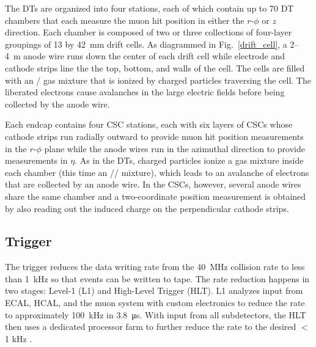 

The DTs are organized into four stations, each of which contain up to 70 DT chambers that each measure the muon hit position in either the $r$-$\phi$ or $z$ direction. Each chamber is composed of two or three collections of four-layer groupings of \num{13} by \SI{42}{\mm} drift cells. As diagrammed in Fig.~\ref{drift_cell}, a \si{2}--\SI{4}{\m} anode wire runs down the center of each drift cell while electrode and cathode strips line the the top, bottom, and walls of the cell. The cells are filled with an / gas mixture that is ionized by charged particles traversing the cell. The liberated electrons cause avalanches in the large electric fields before being collected by the anode wire.



Each endcap contains four CSC stations, each with six layers of CSCs whose cathode strips run radially outward to provide muon hit position measurements in the $r$-$\phi$ plane while the anode wires run in the azimuthal direction to provide measurements in $\eta$. As in the DTs, charged particles ionize a gas mixture inside each chamber (this time an // mixture), which leads to an avalanche of electrons that are collected by an anode wire. In the CSCs, however, several anode wires share the same chamber and a two-coordinate position measurement is obtained by also reading out the induced charge on the perpendicular cathode strips.


\subsection{Trigger}
\label{trigger}
The trigger reduces the data writing rate from the \SI{40}{\MHz} collision rate to less than \SI{1}{\kHz} so that events can be written to tape. The rate reduction happens in two stages: Level-1 (L1) and High-Level Trigger (HLT). L1 analyzes input from ECAL, HCAL, and the muon system with custom electronics to reduce the rate to approximately \SI{100}{\kHz} in \SI{3.8}{\us}. With input from all subdetectors, the HLT then uses a dedicated processor farm to further reduce the rate to the desired $<$ 1 kHz \cite{cms_experiment, cms_trigger_upgrade}.

